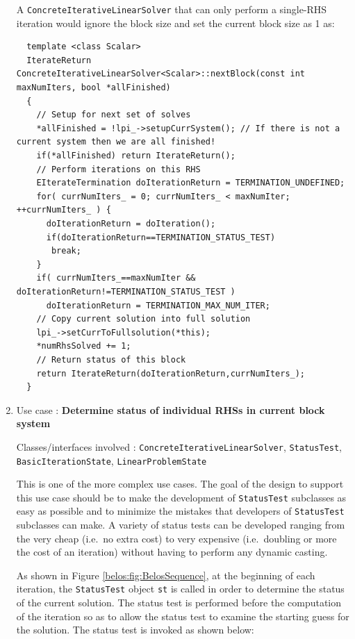 \documentclass[pdf,ps2pdf,11pt]{SANDreport}
\begin{document}
\begin{enumerate}
A {}\texttt{Concrete\-Iterative\-Linear\-Solver} that can only perform a
single-RHS iteration would ignore the block size and set the current
block size as 1 as:

{\scriptsize\begin{verbatim}
  template <class Scalar>
  IterateReturn ConcreteIterativeLinearSolver<Scalar>::nextBlock(const int maxNumIters, bool *allFinished)
  {
    // Setup for next set of solves
    *allFinished = !lpi_->setupCurrSystem(); // If there is not a current system then we are all finished!
    if(*allFinished) return IterateReturn(); 
    // Perform iterations on this RHS
    EIterateTermination doIterationReturn = TERMINATION_UNDEFINED;
    for( currNumIters_ = 0; currNumIters_ < maxNumIter; ++currNumIters_ ) {
      doIterationReturn = doIteration();
      if(doIterationReturn==TERMINATION_STATUS_TEST)
       break;
    }
    if( currNumIters_==maxNumIter && doIterationReturn!=TERMINATION_STATUS_TEST )
      doIterationReturn = TERMINATION_MAX_NUM_ITER;
    // Copy current solution into full solution
    lpi_->setCurrToFullsolution(*this);
    *numRhsSolved += 1;
    // Return status of this block
    return IterateReturn(doIterationReturn,currNumIters_);
  }
\end{verbatim}}

{}\item Use case : \textbf{Determine status of individual RHSs in 
current block system}

{}\noindent{}Classes/interfaces involved :
{}\texttt{Concrete\-Iterative\-Linear\-Solver}, {}\texttt{Status\-Test},
{}\texttt{Basic\-Iteration\-State}, {}\texttt{Linear\-Problem\-State}

This is one of the more complex use cases.  The goal of the design to
support this use case should be to make the development of
{}\texttt{Status\-Test} subclasses as easy as possible and to minimize
the mistakes that developers of {}\texttt{Status\-Test} subclasses can
make.  A variety of status tests can be developed ranging from the
very cheap (i.e.~no extra cost) to very expensive (i.e.~doubling or
more the cost of an iteration) without having to perform any dynamic
casting.

As shown in Figure {}\ref{belos:fig:BelosSequence}, at the beginning
of each iteration, the {}\texttt{Status\-Test} object {}\texttt{st} is
called in order to determine the status of the current solution.  The
status test is performed before the computation of the iteration so as
to allow the status test to examine the starting guess for the
solution.  The status test is invoked as shown below:


\end{enumerate}
\end{document}
